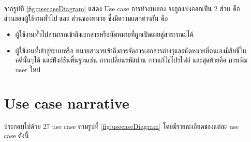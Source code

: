 \documentclass[12pt,oneside,openright,a4paper]{cpe-thai-project}
\begin{document}
จากรูปที่ \ref{fig:usecaseDiagram} แสดง Use case การทำงานของ จะถูกแบ่งออกเป็น 2 ส่วน คือ ส่วนของผู้ใช้งานทั่วไป และ ส่วนของทนาย ซึ่งมีความแตกต่างกัน คือ 
\begin{itemize}
    \item ผู้ใช้งานทั่วไปสามารถเข้าถึงเอกสารหรือนัดหมายที่ถูกเปิดเผยสู่สาธารณะได้ 
    \item ผู้ใช้งานที่เข้าสู่ระบบหรือ ทนายสามารเข้าถึงการจัดการเอกสารต่างๆและนัดหมายที่ตนเองมีสิทธิ์ในคดีนั้นๆได้ และฟังก์ชันพื้นฐานเช่น การเปลี่ยนรหัสผ่าน การแก้ไขโปรไฟล์ และสุดท้ายคือ การเพิ่ม user ใหม่ 
\end{itemize}


\clearpage
\section{Use case narrative}
ประกอบไปด้วย 27 use case ตามรูปที่ \ref{fig:usecaseDiagram} โดยมีรายละเอียดของแต่ละ use case ดังนี้
\end{document}
